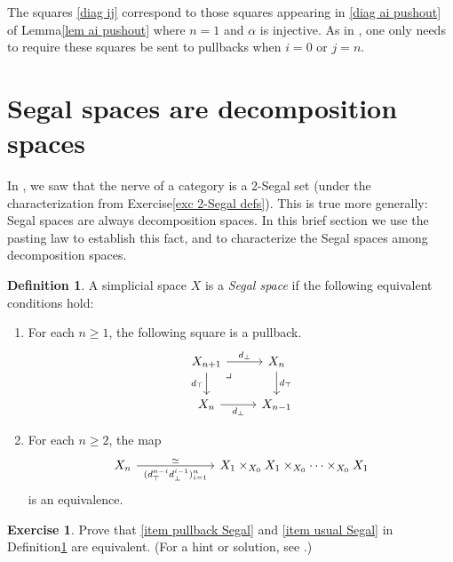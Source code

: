 \documentclass{amsart}
\theoremstyle{definition}
\newtheorem{definition}[theorem]{Definition}
\newtheorem{exercise}[theorem]{Exercise}
\theoremstyle{remark}
\begin{document}
The squares \eqref{diag ij} correspond to those squares appearing in \eqref{diag ai pushout} of Lemma\nobreakspace \ref {lem ai pushout} where $n=1$ and $\alpha$ is injective.
As in \cite[Proposition 2.3.2]{DyckerhoffKapranov:HSS}, one only needs to require these squares be sent to pullbacks when $i=0$ or $j=n$.

\section{Segal spaces are decomposition spaces}\label{sec segal spaces}

In \cite{Stern:BIRS}, we saw that the nerve of a category is a 2-Segal set (under the characterization from Exercise\nobreakspace \ref {exc 2-Segal defs}).
This is true more generally: Segal spaces \cite{Rezk:MHTHT,Segal:CCT} are always decomposition spaces.
In this brief section we use the pasting law to establish this fact, and to characterize the Segal spaces among decomposition spaces.

\begin{definition}\label{def Segal}
A simplicial space $X$ is a \emph{Segal space} if the following equivalent conditions hold:
\begin{enumerate}
\item \label{item pullback Segal} For each $n\geq 1$, the following square is a pullback. 
\[ \begin{tikzcd}
X_{n+1} \ar[dr, phantom, "\lrcorner" very near start] \rar{d_\bot} \dar[swap]{d_\top} & X_n \dar{d_\top} \\
X_n \rar[swap]{d_\bot} & X_{n-1}
\end{tikzcd} \]
\item For each $n\geq 2$, the map
\[
\begin{tikzcd}[column sep=2.2cm]
X_n \rar["(d_\top^{n-i} d_\bot^{i-1})_{i=1}^n" swap, "\simeq"] & X_1 \times_{X_0} X_1 \times_{X_0} \dots  \times_{X_0} X_1
\end{tikzcd} 
\]
is an equivalence. \label{item usual Segal}
\end{enumerate}
\end{definition}

\begin{exercise}
Prove that \eqref{item pullback Segal} and \eqref{item usual Segal} in Definition\nobreakspace \ref {def Segal} are equivalent. (For a hint or solution, see \cite[Lemma 2.10]{GKT1}.)
\end{exercise}
\end{document}
